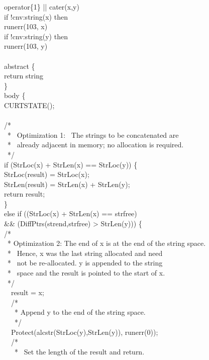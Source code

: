 %
\begin{iconcode}
\>operator\{1\} || cater(x,y)\\
\>if !cnv:string(x) then\\
\>\>runerr(103, x)\\
\>if !cnv:string(y) then\\
\>\>runerr(103, y)\\
\\
\>abstract \{\\
\>\>return string\\
\>\>\}\\
\>body \{\\
\>\>CURTSTATE();\\
\\
\>\>/*\\
\>\>\ * \ Optimization 1: \ The strings to be concatenated are\\
\>\>\ * \ already adjacent in memory; no allocation is required.\\
\>\>\ */\\
\>\>if (StrLoc(x) + StrLen(x) == StrLoc(y)) \{\\
\>\>\>StrLoc(result) = StrLoc(x);\\
\>\>\>StrLen(result) = StrLen(x) + StrLen(y);\\
\>\>\>return result;\\
\>\>\>\}\\
\>\>else if ((StrLoc(x) + StrLen(x) == strfree)\\
\>\>\&\& (DiffPtrs(strend,strfree) > StrLen(y))) \{\\
\>\>\>/*\\
\>\>\>\ * Optimization 2: The end of x is at the end of the string space.\\
\>\>\>\ * \ Hence, x was the last string allocated and need\\
\>\>\>\ * \ not be re-allocated. y is appended to the string\\
\>\>\>\ * \ space and the result is pointed to the start of x.\\
\>\>\>\ */\\
\ \  result = x;\\
\ \  /*\\
\ \  \ * Append y to the end of the string space.\\
\ \  \ */\\
\ \  Protect(alcstr(StrLoc(y),StrLen(y)), runerr(0));\\
\ \  /*\\
\ \  \ * \ Set the length of the result and return.\\

\end{iconcode}
